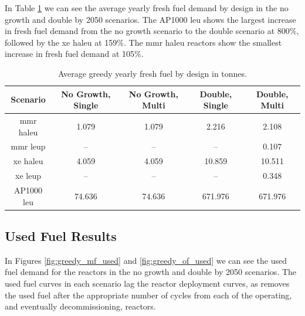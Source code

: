 In Table \ref{tab:greedy_fresh_avg} we can see the average yearly fresh fuel demand by design in the no growth and double by 2050 scenarios. The AP1000 \gls{leu} shows the largest increase in fresh fuel demand from the no growth scenario to the double scenario at 800\%, followed by the \gls{xe} \gls{haleu} at 159\%. The \gls{mmr} \gls{haleu} reactors show the smallest increase in fresh fuel demand at 105\%.


\begin{table}[H]
  \centering
  \caption{Average greedy yearly fresh fuel by design in tonnes.}
  \label{tab:greedy_fresh_avg}
  \begin{tabular}{c c c c c}
     \hline
     Scenario & No Growth, Single & No Growth, Multi & Double, Single & Double, Multi  \\
     \hline
     \gls{mmr} \gls{haleu}   & 1.079    & 1.079   & 2.216    & 2.108    \\
     \gls{mmr} \gls{leup}    & --       & --      & --       & 0.107    \\
     \gls{xe} \gls{haleu}    & 4.059    & 4.059   & 10.859   & 10.511   \\
     \gls{xe} \gls{leup}     & --       & --      & --       & 0.348    \\
     AP1000 \gls{leu}        & 74.636   & 74.636  & 671.976  & 671.976  \\
     \hline
  \end{tabular}
\end{table}



\subsection{Used Fuel Results}
\label{sec:greedy_used}

In Figures \ref{fig:greedy_mf_used} and \ref{fig:greedy_of_used} we can see the used fuel demand for the reactors in the no growth and double by 2050 scenarios. The used fuel curves in each scenario lag the reactor deployment curves, as \cyclus removes the used fuel after the appropriate number of cycles from  each of the operating, and eventually decommissioning, reactors.

